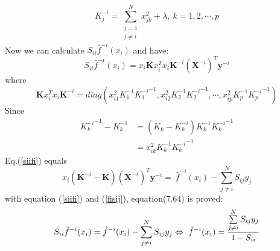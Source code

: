 \documentclass[12pt]{article}
\def\mbf#1{\mathbf{#1}}
\begin{document}
\begin{equation}
    K_j^{-i} = \sum\limits_{\substack{j=1\\ j\neq i}}^{N}x_{jk}^2+\lambda,\ k=1,2,\cdots,p
\end{equation} 
Now we can calculate $S_{ii}\hat{f}^{-i}(x_i)$ and have:
\begin{equation}
    S_{ii}\hat{f}^{-i}(x_i) = 
    x_i\mbf{K}x_i^T x_i\mbf{K}^{-i} (\mbf{X}^{-i})^T \mbf{y}^{-i}
    \label{siifi}
\end{equation}
where 
\begin{equation*}
    \mbf{K}x_i^T x_i\mbf{K}^{-i} = 
    diag(x_{i1}^2 K_1^{-1} {K_1^{-i}}^{-1}, 
    x_{i2}^2 K_2^{-1} {K_2^{-i}}^{-1}, \cdots,
    x_{ip}^2 K_p^{-1} {K_p^{-i}}^{-1})
\end{equation*}
Since
\begin{align*}
    {K_k^{-i}}^{-1} - K_k^{-1} &=(K_k-K_k^{-i})  K_k^{-1} {K_k^{-i}}^{-1}\\
    &=x_{ik}^2 K_k^{-1} {K_k^{-i}}^{-1}
\end{align*}
Eq.(\ref{siifi}) equals
\begin{equation}
    x_i(\mbf{K}^{-i}-\mbf{K})(\mbf{X}^{-i})^T \mbf{y}^{-i} =\
    \hat{f}^{-i}(x_i) - \sum\limits_{j\neq i}^N S_{ij}y_j
    \label{fisij}
\end{equation}
with equation (\ref{siifi}) and (\ref{fisij}), equation(7.64) is proved:
$$S_{ii}\hat{f}^{-i}(x_i) = \hat{f}^{-i}(x_i)-\sum\limits_{j\neq i}^N S_{ij}y_j\\
\Leftrightarrow\ \hat{f}^{-i}(x_i) = \frac{\sum\limits_{j\neq i}^N S_{ij}y_j}{1-S_{ii}}
$$
\end{document}
